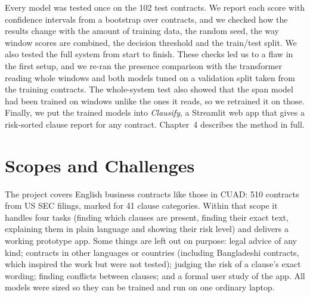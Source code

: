 Every model was tested once on the 102 test contracts. We report each score with confidence intervals from a bootstrap over contracts, and we checked how the results change with the amount of training data, the random seed, the way window scores are combined, the decision threshold and the train/test split. We also tested the full system from start to finish. These checks led us to a flaw in the first setup, and we re-ran the presence comparison with the transformer reading whole windows and both models tuned on a validation split taken from the training contracts. The whole-system test also showed that the span model had been trained on windows unlike the ones it reads, so we retrained it on those. Finally, we put the trained models into \emph{Clausify}, a Streamlit web app that gives a risk-sorted clause report for any contract. Chapter~4 describes the method in full.

\section{Scopes and Challenges}
The project covers English business contracts like those in CUAD: 510 contracts from US SEC filings, marked for 41 clause categories. Within that scope it handles four tasks (finding which clauses are present, finding their exact text, explaining them in plain language and showing their risk level) and delivers a working prototype app. Some things are left out on purpose: legal advice of any kind; contracts in other languages or countries (including Bangladeshi contracts, which inspired the work but were not tested); judging the risk of a clause's exact wording; finding conflicts between clauses; and a formal user study of the app. All models were sized so they can be trained and run on one ordinary laptop.

